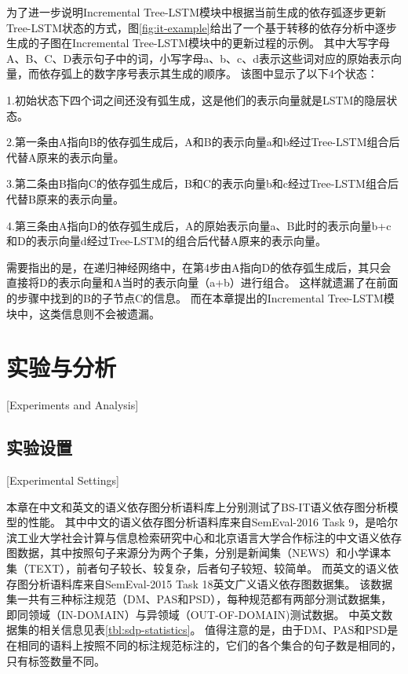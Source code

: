 为了进一步说明Incremental Tree-LSTM模块中根据当前生成的依存弧逐步更新Tree-LSTM状态的方式，图\ref{fig:it-example}给出了一个基于转移的依存分析中逐步生成的子图在Incremental Tree-LSTM模块中的更新过程的示例。
其中大写字母A、B、C、D表示句子中的词，小写字母a、b、c、d表示这些词对应的原始表示向量，而依存弧上的数字序号表示其生成的顺序。
该图中显示了以下4个状态：

1.初始状态下四个词之间还没有弧生成，这是他们的表示向量就是LSTM的隐层状态。

2.第一条由A指向B的依存弧生成后，A和B的表示向量a和b经过Tree-LSTM组合后代替A原来的表示向量。

3.第二条由B指向C的依存弧生成后，B和C的表示向量b和c经过Tree-LSTM组合后代替B原来的表示向量。

4.第三条由A指向D的依存弧生成后，A的原始表示向量a、B此时的表示向量b+c和D的表示向量d经过Tree-LSTM的组合后代替A原来的表示向量。

需要指出的是，在递归神经网络中，在第4步由A指向D的依存弧生成后，其只会直接将D的表示向量和A当时的表示向量（a+b）进行组合。
这样就遗漏了在前面的步骤中找到的B的子节点C的信息。
而在本章提出的Incremental Tree-LSTM模块中，这类信息则不会被遗漏。

\section{实验与分析}[Experiments and Analysis]

\subsection{实验设置}[Experimental Settings]

本章在中文和英文的语义依存图分析语料库上分别测试了BS-IT语义依存图分析模型的性能。
其中中文的语义依存图分析语料库来自SemEval-2016 Task 9\cite{che-etal-2016-semeval}，是哈尔滨工业大学社会计算与信息检索研究中心和北京语言大学合作标注的中文语义依存图数据，其中按照句子来源分为两个子集，分别是新闻集（NEWS）和小学课本集（TEXT），前者句子较长、较复杂，后者句子较短、较简单。
而英文的语义依存图分析语料库来自SemEval-2015 Task 18\cite{oepen-etal-2015-semeval}英文广义语义依存图数据集。
该数据集一共有三种标注规范（DM、PAS和PSD），每种规范都有两部分测试数据集，即同领域（IN-DOMAIN）与异领域（OUT-OF-DOMAIN)测试数据。
中英文数据集的相关信息见表\ref{tbl:sdp-statistics}。
值得注意的是，由于DM、PAS和PSD是在相同的语料上按照不同的标注规范标注的，它们的各个集合的句子数是相同的，只有标签数量不同。

